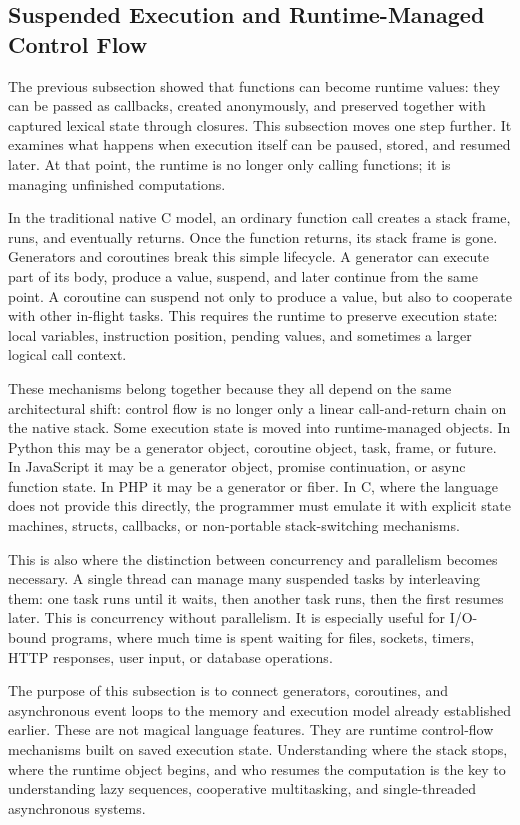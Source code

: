 \subsection{Suspended Execution and Runtime-Managed Control Flow}

The previous subsection showed that functions can become runtime values: they can be passed as callbacks, created anonymously, and preserved together with captured lexical state through closures. This subsection moves one step further. It examines what happens when execution itself can be paused, stored, and resumed later. At that point, the runtime is no longer only calling functions; it is managing unfinished computations.

In the traditional native C model, an ordinary function call creates a stack frame, runs, and eventually returns. Once the function returns, its stack frame is gone. Generators and coroutines break this simple lifecycle. A generator can execute part of its body, produce a value, suspend, and later continue from the same point. A coroutine can suspend not only to produce a value, but also to cooperate with other in-flight tasks. This requires the runtime to preserve execution state: local variables, instruction position, pending values, and sometimes a larger logical call context.

These mechanisms belong together because they all depend on the same architectural shift: control flow is no longer only a linear call-and-return chain on the native stack. Some execution state is moved into runtime-managed objects. In Python this may be a generator object, coroutine object, task, frame, or future. In JavaScript it may be a generator object, promise continuation, or async function state. In PHP it may be a generator or fiber. In C, where the language does not provide this directly, the programmer must emulate it with explicit state machines, structs, callbacks, or non-portable stack-switching mechanisms.

This is also where the distinction between concurrency and parallelism becomes necessary. A single thread can manage many suspended tasks by interleaving them: one task runs until it waits, then another task runs, then the first resumes later. This is concurrency without parallelism. It is especially useful for I/O-bound programs, where much time is spent waiting for files, sockets, timers, HTTP responses, user input, or database operations.

The purpose of this subsection is to connect generators, coroutines, and asynchronous event loops to the memory and execution model already established earlier. These are not magical language features. They are runtime control-flow mechanisms built on saved execution state. Understanding where the stack stops, where the runtime object begins, and who resumes the computation is the key to understanding lazy sequences, cooperative multitasking, and single-threaded asynchronous systems.


